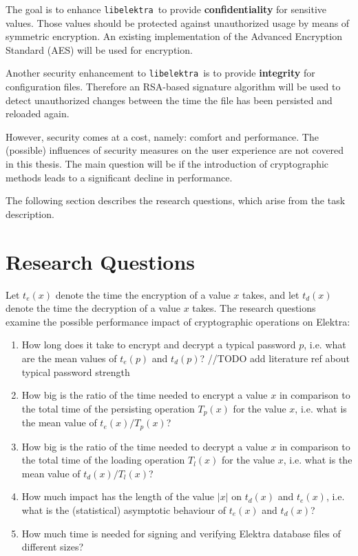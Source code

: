 \documentclass[a4paper,12pt]{article}
\newcommand{\libelektra}{\texttt{libelektra}~}
\begin{document}
The goal is to enhance \libelektra to provide \textbf{confidentiality} for sensitive values.
Those values should be protected against unauthorized usage by means of symmetric encryption.
An existing implementation of the Advanced Encryption Standard (AES) will be used for encryption.

Another security enhancement to \libelektra is to provide \textbf{integrity} for configuration files.
Therefore an RSA-based signature algorithm will be used to detect unauthorized changes between the time the file has been persisted and reloaded again.

However, security comes at a cost, namely: comfort and performance. The (possible) influences of security measures on the user experience are not covered in this thesis. The main question will be if the introduction of cryptographic methods leads to a significant decline in performance.

The following section describes the research questions, which arise from the task description.


\section{Research Questions}

Let $t_e(x)$ denote the time the encryption of a value $x$ takes, and let $t_d(x)$ denote the time the decryption of a value $x$ takes.
The research questions examine the possible performance impact of cryptographic operations on Elektra:

\begin{enumerate}
\item How long does it take to encrypt and decrypt a typical password $p$, i.e. what are the mean values of $t_e(p)$ and $t_d(p)$? //TODO add literature ref about typical password strength
  
\item How big is the ratio of the time needed to encrypt a value $x$ in comparison to the total time of the persisting operation $T_p(x)$ for the value $x$, i.e. what is the mean value of $t_e(x)/T_p(x)$?
  
\item How big is the ratio of the time needed to decrypt a value $x$ in comparison to the total time of the loading operation $T_l(x)$ for the value $x$, i.e. what is the mean value of $t_d(x)/T_l(x)$?

\item How much impact has the length of the value $|x|$ on $t_d(x)$ and $t_e(x)$, i.e. what is the (statistical) asymptotic behaviour of $t_e(x)$ and $t_d(x)$?

\item How much time is needed for signing and verifying Elektra database files of different sizes?
  
\end{enumerate}
\end{document}
